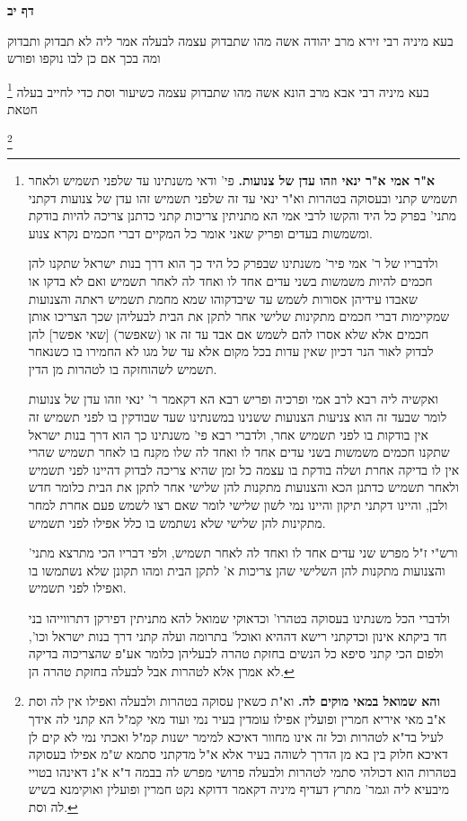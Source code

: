 \documentclass[12pt, openany]{book}
\newcommand{\sethebfont}{
\fontsize{10.5pt}{21.0pt} \selectfont
}
\newcommand{\twocol}[1]{
	{\sethebfont \begin{multicols}{2}
			#1
	\end{multicols}}	
}
\newcommand{\sectname}{}
\newcommand{\newsection}[1]{
	\addcontentsline{toc}{section}{#1}
	\renewcommand{\sectname}{#1}	
	\vspace{-\baselineskip}
	\begin{center}
		\textbf{%
\fontsize{16pt}{16pt}\selectfont
			#1}
	\end{center}
	\vspace{-\baselineskip}
	\nopagebreak
}
\newcommand{\footnotecomment}[1]{
	\renewcommand\thefootnote{}
	\footnote{#1}}
\newcommand{\commenta}[1]{\footnotecomment{#1}}
\begin{document}
\newsection{דף יב}
\twocol{בעא מיניה רבי זירא מרב יהודה אשה מהו שתבדוק עצמה לבעלה אמר ליה לא תבדוק ותבדוק ומה בכך אם כן לבו נוקפו ופורש 
\commenta{\textbf{א"ר אמי א"ר ינאי וזהו עדן של צנועות.} פי' ודאי משנתינו עד שלפני תשמיש ולאחר תשמיש קתני ובעסוקה בטהרות וא"ר ינאי עד זה שלפני תשמיש זהו עדן של צנועות דקתני מתני' בפרק כל היד והקשו לרבי אמי הא מתניתין צריכות קתני כדתנן צריכה להיות בודקת ומשמשות בעדים ופריק שאני אומר כל המקיים דברי חכמים נקרא צנוע.\par ולדבריו של ר' אמי פיר' משנתינו שבפרק כל היד כך הוא דרך בנות ישראל שתקנו להן חכמים להיות משמשות בשני עדים אחד לו ואחד לה לאחר תשמיש ואם לא בדקו או שאבדו עידיהן אסורות לשמש עד שיבדקוהו שמא מחמת תשמיש ראתה והצנועות שמקיימות דברי חכמים מתקינות שלישי אחר לתקן את הבית לבעליהן שכך הצריכו אותן חכמים אלא שלא אסרו להם לשמש אם אבד עד זה או (שאפשר) [שאי אפשר] להן לבדוק לאור הנר דכיון שאין עדות בכל מקום אלא עד של מגו לא החמירו בו כשנאחר תשמיש לשהוחזקה בו לטהרות מן הדין.\par ואקשיה ליה רבא לרב אמי ופרכיה ופריש רבא הא דקאמר ר' ינאי וזהו עדן של צנועות לומר שבעד זה הוא צניעות הצנועות ששנינו במשנתינו שעד שבודקין בו לפני תשמיש זה אין בודקות בו לפני תשמיש אחר, ולדברי רבא פי' משנתינו כך הוא דרך בנות ישראל שתקנו חכמים משמשות בשני עדים אחד לו ואחד לה שלו מקנח בו לאחר תשמיש שהרי אין לו בדיקה אחרת ושלה בודקת בו עצמה כל זמן שהיא צריכה לבדוק דהיינו לפני תשמיש ולאחר תשמיש כדתנן הכא והצנועות מתקנות להן שלישי אחר לתקן את הבית כלומר חדש ולבן, והיינו דקתני תיקון והיינו נמי לשון שלישי לומר שאם רצו לשמש פעם אחרת למחר מתקינות להן שלישי שלא נשתמש בו כלל אפילו לפני תשמיש.\par ורש"י ז"ל מפרש שני עדים אחד לו ואחד לה לאחר תשמיש, ולפי דבריו הכי מתרצא מתני' והצנועות מתקנות להן השלישי שהן צריכות א' לתקן הבית ומהו תקונן שלא נשתמשו בו ואפילו לפני תשמיש.\par ולדברי הכל משנתינו בעסוקה בטהרו' וכדאוקי שמואל להא מתניתין דפירקן דתרווייהו בני חד ביקתא אינון וכדקתני רישא דההיא ואוכל' בתרומה ועלה קתני דרך בנות ישראל וכו', ולפום הכי קתני סיפא כל הנשים בחזקת טהרה לבעליהן כלומר אע"פ שהצריכוה בדיקה לא אמרן אלא לטהרות אבל לבעלה בחזקת טהרה הן. }
בעא מיניה רבי אבא מרב הונא אשה מהו שתבדוק עצמה כשיעור וסת כדי לחייב בעלה חטאת 
\commenta{\textbf{והא שמואל במאי מוקים לה.} וא"ת כשאין עסוקה בטהרות ולבעלה ואפילו אין לה וסת א"ב מאי איריא חמרין ופועלין אפילו עומדין בעיר נמי ועוד מאי קמ"ל הא קתני לה אידך לעיל בד"א לטהרות וכל זה אינו מחוור דאיכא למימר ישנות קמ"ל ואכתי נמי לא קים לן דאיכא חלוק בין בא מן הדרך לשוהה בעיר אלא א"ל מדקתני סתמא ש"מ אפילו בעסוקה בטהרות הוא דכולהי סתמי לטהרות ולבעלה פרושי מפרש לה בבמה ד"א א"נ דאינהו בטויי מיבעיא ליה וגמר' מתרץ דעדיף מיניה דקאמר דדוקא נקט חמרין ופועלין ואוקימנא בשיש לה וסת. }
}
\end{document}
